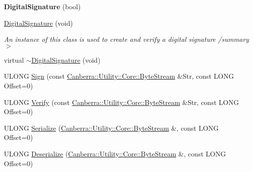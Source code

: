\begin{DoxyCompactItemize}
\item 
\mbox{\label{class_canberra_1_1_data_types_1_1_serialization_1_1_digital_signature_a64bf1f9e2f96323e99abc845bff49198}} 
{\bfseries Digital\+Signature} (bool)
\item 
\hyperlink{class_canberra_1_1_data_types_1_1_serialization_1_1_digital_signature_a3c469d1e6a379facc131ce5e08016fb6_a3c469d1e6a379facc131ce5e08016fb6}{Digital\+Signature} (void)
\begin{DoxyCompactList}\small\item\em An instance of this class is used to create and verify a digital signature /summary$>$ \end{DoxyCompactList}\item 
virtual \hyperlink{class_canberra_1_1_data_types_1_1_serialization_1_1_digital_signature_a0b4d8b470ad2169f3e0c570fe8543c81_a0b4d8b470ad2169f3e0c570fe8543c81}{$\sim$\+Digital\+Signature} (void)
\item 
U\+L\+O\+NG \hyperlink{class_canberra_1_1_data_types_1_1_serialization_1_1_digital_signature_a921db506de54c50ea512a93d7da67b24_a921db506de54c50ea512a93d7da67b24}{Sign} (const \hyperlink{class_canberra_1_1_utility_1_1_core_1_1_byte_stream}{Canberra\+::\+Utility\+::\+Core\+::\+Byte\+Stream} \&Str, const L\+O\+NG Offset=0)
\item 
U\+L\+O\+NG \hyperlink{class_canberra_1_1_data_types_1_1_serialization_1_1_digital_signature_a338d5cd12ad24843b358e1d996429b4c_a338d5cd12ad24843b358e1d996429b4c}{Verify} (const \hyperlink{class_canberra_1_1_utility_1_1_core_1_1_byte_stream}{Canberra\+::\+Utility\+::\+Core\+::\+Byte\+Stream} \&Str, const L\+O\+NG Offset=0)
\item 
U\+L\+O\+NG \hyperlink{class_canberra_1_1_data_types_1_1_serialization_1_1_digital_signature_a22fda5263703438775acd080c00a872c_a22fda5263703438775acd080c00a872c}{Serialize} (\hyperlink{class_canberra_1_1_utility_1_1_core_1_1_byte_stream}{Canberra\+::\+Utility\+::\+Core\+::\+Byte\+Stream} \&, const L\+O\+NG Offset=0)
\item 
U\+L\+O\+NG \hyperlink{class_canberra_1_1_data_types_1_1_serialization_1_1_digital_signature_a0ac2ccfe7af9da4fab5f87783d226cb3_a0ac2ccfe7af9da4fab5f87783d226cb3}{Deserialize} (\hyperlink{class_canberra_1_1_utility_1_1_core_1_1_byte_stream}{Canberra\+::\+Utility\+::\+Core\+::\+Byte\+Stream} \&, const L\+O\+NG Offset=0)
\item 

\end{DoxyCompactItemize}
